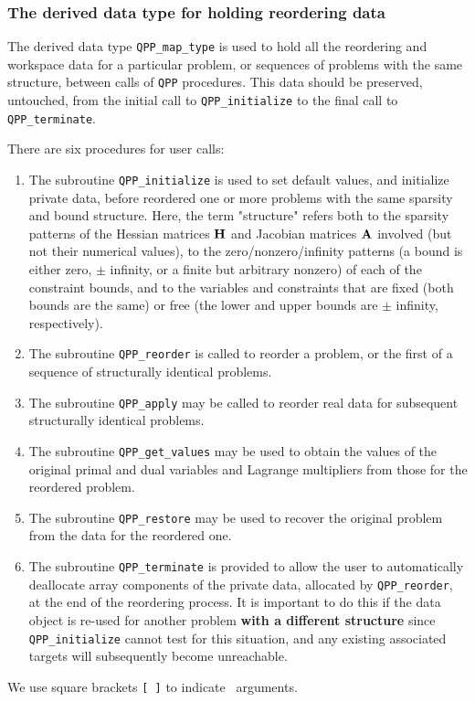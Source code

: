 \documentclass{galahad}
\newcommand{\packagename}{QPP}
\begin{document}

\subsubsection{The derived data type for holding reordering data}\label{typemap}
The derived data type
{\tt \packagename\_map\_type}
is used to hold all the reordering and workspace data for a particular
problem, or sequences of problems with the same structure, between calls of
{\tt \packagename} procedures.
This data should be preserved, untouched, from the initial call to
{\tt \packagename\_initialize}
to the final call to
{\tt \packagename\_terminate}.


\galarguments
There are six procedures for user calls:

\begin{enumerate}
\item The subroutine
  {\tt \packagename\_initialize}
  is used to set default
  values, and initialize private data, before reordered one or more problems
  with the same sparsity and bound structure.
  Here, the term "structure" refers both to
  the sparsity patterns of the Hessian matrices ${\mathbf{H}}$ and Jacobian
  matrices ${\mathbf{A}}$ involved
  (but not their numerical values), to the zero/nonzero/infinity patterns
  (a bound is either zero, $\pm$ infinity, or a finite but arbitrary
  nonzero) of each of the constraint bounds, and to the variables and
  constraints that are fixed (both bounds are the same) or free
  (the lower and upper bounds are $\pm$ infinity, respectively).

\item The subroutine
  {\tt \packagename\_reorder}
  is called to reorder a problem, or the first of a sequence of structurally
  identical problems.

\item The subroutine
  {\tt \packagename\_apply}
  may be called to reorder real data for subsequent structurally identical
  problems.

\item The subroutine
  {\tt \packagename\_get\_values}
  may be used to obtain the values of the original primal and dual variables
  and Lagrange multipliers from those for the reordered problem.

\item The subroutine {\tt \packagename\_restore} may be used to recover the
  original problem from the data for the reordered one.

\item The subroutine
  {\tt \packagename\_terminate}
  is provided to allow the user to automatically deallocate array components
  of the private data,  allocated by
  {\tt \packagename\_reorder},
  at the end of the reordering process. It is important to do this if the data
  object is re-used for another problem {\bf with a different structure}
  since {\tt \packagename\_initialize} cannot test for this situation,
  and any existing associated targets will subsequently become unreachable.
\end{enumerate}
We use square brackets {\tt [ ]} to indicate \optional\ arguments.
\end{document}

